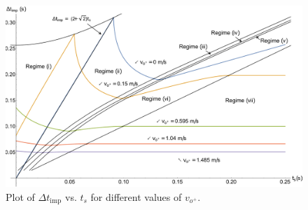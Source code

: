 \documentclass[letterpaper, 10 pt, journal, twoside]{ieeetran}
\begin{document}
\begin{figure}
	\includegraphics[width=\linewidth]{deltVsts_differentVop.pdf}
	\caption[Variation of time between impacts with switching time for partially closed-loop control]{Plot of $\Delta t_{\textrm{imp}}$ vs. $t_s$ for different values of $v_{o^+}$.}
	\label{delTvsTs}
	\vspace{-0.5em}
\end{figure}
\end{document}
